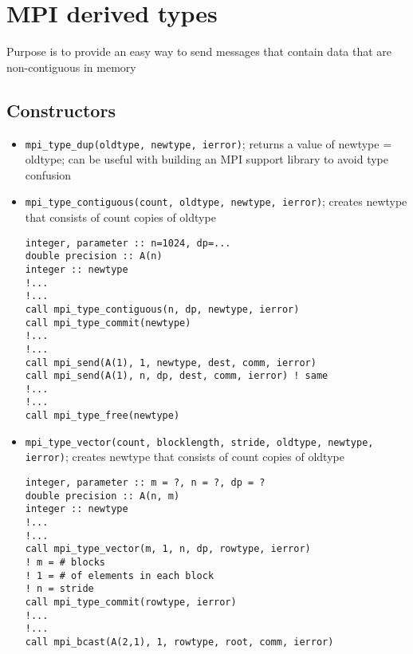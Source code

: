 \documentclass[10pt]{article}
\newenvironment{mitemize}
{
  \begin{itemize}
  \setlength{\itemsep}{1pt}
  \setlength{\parskip}{0pt}
  \setlength{\parsep}{0pt}}{\end{itemize}
}
\begin{document}
\section*{MPI derived types}
Purpose is to provide an easy way to send messages that contain data that are non-contiguous in memory

\subsection*{Constructors}
\begin{mitemize}
  \item \texttt{mpi\_type\_dup(oldtype, newtype, ierror)}; returns a value of newtype = oldtype; can be useful with building an MPI support library to avoid type confusion
  \item \texttt{mpi\_type\_contiguous(count, oldtype, newtype, ierror)}; creates newtype that consists of count copies of oldtype
\begin{verbatim}
integer, parameter :: n=1024, dp=...
double precision :: A(n)
integer :: newtype
!...
!...
call mpi_type_contiguous(n, dp, newtype, ierror)
call mpi_type_commit(newtype)
!...
!...
call mpi_send(A(1), 1, newtype, dest, comm, ierror)
call mpi_send(A(1), n, dp, dest, comm, ierror) ! same
!...
!...
call mpi_type_free(newtype)
\end{verbatim}
  \item \texttt{mpi\_type\_vector(count, blocklength, stride, oldtype, newtype, ierror)}; creates newtype that consists of count copies of oldtype
\begin{verbatim}
integer, parameter :: m = ?, n = ?, dp = ?
double precision :: A(n, m)
integer :: newtype
!...
!...
call mpi_type_vector(m, 1, n, dp, rowtype, ierror)
! m = # blocks
! 1 = # of elements in each block
! n = stride
call mpi_type_commit(rowtype, ierror)
!...
!...
call mpi_bcast(A(2,1), 1, rowtype, root, comm, ierror)
\end{verbatim}
\end{mitemize}
\end{document}

